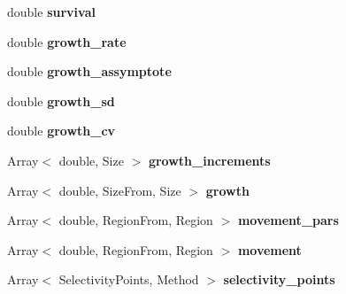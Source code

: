 \begin{DoxyCompactItemize}
\item 
\hypertarget{classIOSKJ_1_1Model_aeeec3e4e692016d4b6913a47075a0a5d}{double {\bfseries survival}}\label{classIOSKJ_1_1Model_aeeec3e4e692016d4b6913a47075a0a5d}

\item 
\hypertarget{classIOSKJ_1_1Model_a37a3bf07009aa97913f40e58110e8bdf}{double {\bfseries growth\-\_\-rate}}\label{classIOSKJ_1_1Model_a37a3bf07009aa97913f40e58110e8bdf}

\item 
\hypertarget{classIOSKJ_1_1Model_a02f4a83466509247a77ecec82980aa5b}{double {\bfseries growth\-\_\-assymptote}}\label{classIOSKJ_1_1Model_a02f4a83466509247a77ecec82980aa5b}

\item 
\hypertarget{classIOSKJ_1_1Model_ac4a5b947f4c8f00a43d40dde17374222}{double {\bfseries growth\-\_\-sd}}\label{classIOSKJ_1_1Model_ac4a5b947f4c8f00a43d40dde17374222}

\item 
\hypertarget{classIOSKJ_1_1Model_a52e9d3dbf85db8de068b3843c7769ef7}{double {\bfseries growth\-\_\-cv}}\label{classIOSKJ_1_1Model_a52e9d3dbf85db8de068b3843c7769ef7}

\item 
\hypertarget{classIOSKJ_1_1Model_ae56a1109058ca37a7bb05f62ceac6d06}{Array$<$ double, Size $>$ {\bfseries growth\-\_\-increments}}\label{classIOSKJ_1_1Model_ae56a1109058ca37a7bb05f62ceac6d06}

\item 
\hypertarget{classIOSKJ_1_1Model_aa08429f500442de8a2e93bf00b20e0e9}{Array$<$ double, Size\-From, Size $>$ {\bfseries growth}}\label{classIOSKJ_1_1Model_aa08429f500442de8a2e93bf00b20e0e9}

\item 
\hypertarget{classIOSKJ_1_1Model_a035849bda5a75ef50d5d83ce93462fb4}{Array$<$ double, Region\-From, Region $>$ {\bfseries movement\-\_\-pars}}\label{classIOSKJ_1_1Model_a035849bda5a75ef50d5d83ce93462fb4}

\item 
\hypertarget{classIOSKJ_1_1Model_ac09e002c91144697de6e96bb8beb6d83}{Array$<$ double, Region\-From, Region $>$ {\bfseries movement}}\label{classIOSKJ_1_1Model_ac09e002c91144697de6e96bb8beb6d83}

\item 
\hypertarget{classIOSKJ_1_1Model_a2c2ff5eb6f4ed186b725c13b0e9e6012}{Array$<$ Selectivity\-Points, Method $>$ {\bfseries selectivity\-\_\-points}}\label{classIOSKJ_1_1Model_a2c2ff5eb6f4ed186b725c13b0e9e6012}


\end{DoxyCompactItemize}
